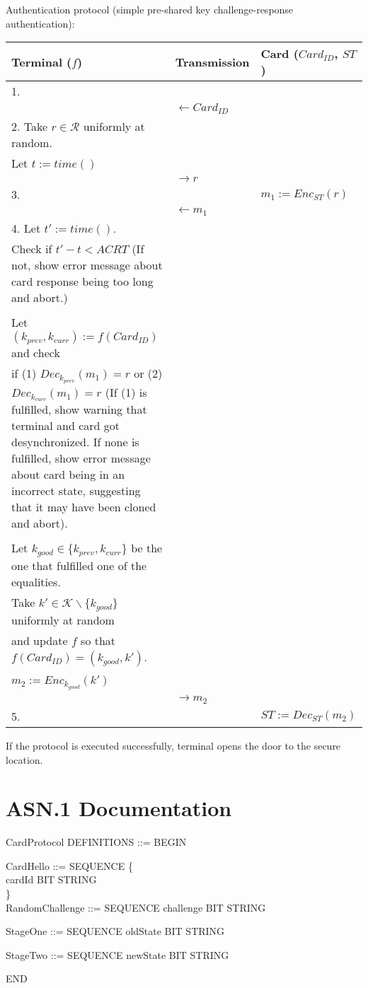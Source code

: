 \documentclass[10pt,titlepage]{article}
\begin{document}
Authentication protocol (simple pre-shared key challenge-response authentication):
 \begin{table}[!ht]
 \centering
	\begin{tabular}{| p{6.55cm}   p{2.55cm}  p{4.55cm}| }
 \hline
 Terminal ($f$) & Transmission  & Card ($Card_{ID}$, $ST$) \\\hline
 1.  & & \\
 &  $\leftarrow Card_{ID}$  & \\
 2. Take $ r \in \mathcal{R} $ uniformly at random. &&\\
Let $t := time()$ &&  \\
 & $\rightarrow r$ &  \\
 3.& &$m_1 := Enc_{ST} (r)$ \\
 &  $\leftarrow m_1$  & \\
4. Let $t' := time()$. &&\\
Check if $t' - t < ACRT$ (If not, show error message about card response being too long and abort.) &&\\
&&\\
Let $(k_{prev}, k_{curr}) := f(Card_{ID})$ and check &&\\
if (1) $Dec_{k_{prev}}(m_1) = r$ or (2) $Dec_{k_{curr}}(m_1) = r$  (If (1) is fulfilled, show warning that terminal and card got desynchronized. If none is fulfilled, show error message about card being in an incorrect state, suggesting that it may have been cloned and abort).&&\\
&&\\
Let $k_{good} \in \{k_{prev}, k_{curr}\}$ be the one that fulfilled one of the equalities.&&\\
Take $k' \in \mathcal{K} \backslash \{k_{good}\} $ uniformly at random &&\\
and update $f$ so that $f(Card_{ID}) = (k_{good}, k')$.&&\\
&&\\
$m_2 := Enc_{k_{good}}(k')$& & \\
 & $\rightarrow m_2$ &  \\ 
5. & & $ ST := Dec_{ST} (m_2)$ \\
 \hline

 \end{tabular}
 \end{table}
 
If the protocol is executed successfully, terminal opens the door to the secure location.
 

\section*{ASN.1 Documentation}

CardProtocol DEFINITIONS ::= BEGIN

    CardHello ::= SEQUENCE \{\\
        cardId       BIT STRING\\
   \}\\

    RandomChallenge ::= SEQUENCE {
        challenge    BIT STRING
    }

    StageOne ::= SEQUENCE {
        oldState     BIT STRING
    }

    StageTwo ::= SEQUENCE {
        newState     BIT STRING
    }

END
\end{document}
